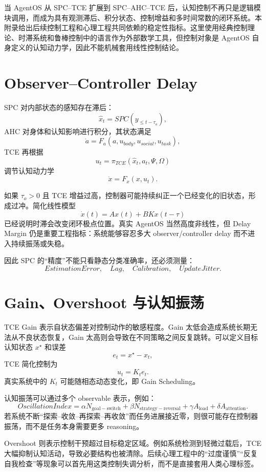 \begin{chapterlead}
当 AgentOS 从 SPC--TCE 扩展到 SPC--AHC--TCE 后，认知控制不再只是逻辑模块调用，而成为具有观测滞后、积分状态、控制增益和多时间常数的闭环系统。本附录给出后续控制工程和心理工程共同依赖的稳定性指标。这里使用经典控制理论、时滞系统和鲁棒控制中的语言作为外部数学工具，但控制对象是 AgentOS 自身定义的认知动力学，因此不能机械套用线性控制结论。
\end{chapterlead}

\section{Observer--Controller Delay}

SPC 对内部状态的感知存在滞后：
\[
\hat x_t
=
SPC(y_{\le t-\tau_o}),
\]
AHC 对身体和认知影响进行积分，其状态满足
\[
\dot a
=
F_a(a,u_{body},u_{social},u_{task}),
\]
TCE 再根据
\[
u_t
=
\pi_{TCE}(\hat x_t,a_t,\Psi,\Omega)
\]
调节认知动力学
\[
\dot x
=
F_x(x,u_t).
\]

如果 $\tau_o>0$ 且 TCE 增益过高，控制器可能持续纠正一个已经变化的旧状态，形成过冲。简化线性模型
\[
\dot x(t)
=
Ax(t)+BKx(t-\tau)
\]
已经说明时滞会改变闭环极点位置。真实 AgentOS 当然高度非线性，但 Delay Margin 仍是重要工程指标：系统能够容忍多大 observer/controller delay 而不进入持续振荡或失稳。

因此 SPC 的“精度”不能只看静态分类准确率，还必须测量：
\[
EstimationError,\quad
Lag,\quad
Calibration,\quad
UpdateJitter.
\]

\section{Gain、Overshoot 与认知振荡}

TCE Gain 表示自状态偏差对控制动作的敏感程度。Gain 太低会造成系统长期无法从不良状态恢复，Gain 太高则会导致在不同策略之间反复跳转。可以定义目标认知状态 $x^\star$ 和误差
\[
e_t=x^\star-x_t,
\]
TCE 简化控制为
\[
u_t=K_te_t.
\]
真实系统中的 $K_t$ 可能随相态动态变化，即 Gain Scheduling。

认知振荡可以通过多个 observable 表示，例如：
\[
OscillationIndex
=
\alpha N_{\mathrm{goal-switch}}
+
\beta N_{\mathrm{strategy-reversal}}
+
\gamma A_{\mathrm{load}}
+
\delta A_{\mathrm{attention}}.
\]
若系统不断“探索--收敛--再探索--再收敛”而任务进展接近零，则很可能存在控制器振荡，而不是任务本身需要更多 reasoning。

Overshoot 则表示控制干预超过目标稳定区域。例如系统检测到轻微过载后，TCE 大幅抑制认知活动，导致必要结构也被清除。后续心理工程中的“过度谨慎”“反复自我检查”等现象可以首先用这类控制失调分析，而不是直接套用人类心理标签。

